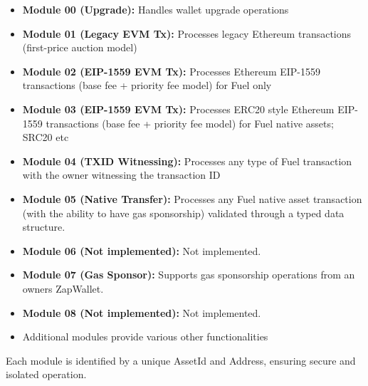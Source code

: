 \begin{itemize}
    \item \textbf{Module 00 (Upgrade):} Handles wallet upgrade operations
    \item \textbf{Module 01 (Legacy EVM Tx):} Processes legacy Ethereum transactions (first-price auction model)
    \item \textbf{Module 02 (EIP-1559 EVM Tx):} Processes Ethereum EIP-1559 transactions (base fee + priority fee model) for Fuel  only
    \item \textbf{Module 03 (EIP-1559 EVM Tx):} Processes ERC20 style Ethereum EIP-1559 transactions (base fee + priority fee model) for Fuel native assets; SRC20 etc
    \item \textbf{Module 04 (TXID Witnessing):} Processes any type of Fuel transaction with the owner witnessing the transaction ID
    \item \textbf{Module 05 (Native Transfer):} Processes any Fuel native asset transaction (with the ability to have gas sponsorship) validated through a typed  data structure.
    \item \textbf{Module 06 (Not implemented):} Not implemented.
    \item \textbf{Module 07 (Gas Sponsor):} Supports gas sponsorship operations from an owners ZapWallet.
    \item \textbf{Module 08 (Not implemented):} Not implemented.
    \item Additional modules provide various other functionalities
\end{itemize}

Each module is identified by a unique AssetId and Address, ensuring secure and isolated operation.